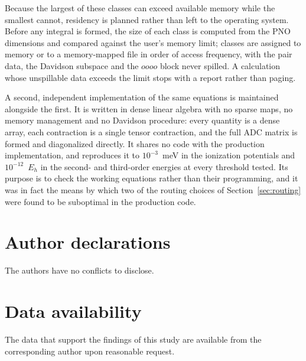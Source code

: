 \documentclass[aip,jcp,amsmath,amssymb,preprint,superscriptaddress]{revtex4-2}%
\begin{document}
Because the largest of these classes can exceed available memory while the
smallest cannot, residency is planned rather than left to the operating
system. Before any integral is formed, the size of each class is computed from
the PNO dimensions and compared against the user's memory limit; classes are
assigned to memory or to a memory-mapped file in order of access frequency,
with the pair data, the Davidson subspace and the $oooo$ block never spilled.
A calculation whose unspillable data exceeds the limit stops with a report
rather than paging.

A second, independent implementation of the same equations is maintained
alongside the first. It is written in dense linear algebra with no sparse
maps, no memory management and no Davidson procedure: every quantity is a
dense array, each contraction is a single tensor contraction, and the full
ADC matrix is formed and diagonalized directly. It shares no code with the
production implementation, and reproduces it to $10^{-3}$~meV in the
ionization potentials and $10^{-12}$~$E_h$ in the second- and third-order
energies at every threshold tested. Its purpose is to check the working
equations rather than their programming, and it was in fact the means by which
two of the routing choices of Section~\ref{sec:routing} were found to be
suboptimal in the production code.

\section*{Author declarations}
The authors have no conflicts to disclose.

\section*{Data availability}
The data that support the findings of this study are available from the
corresponding author upon reasonable request.
\end{document}
